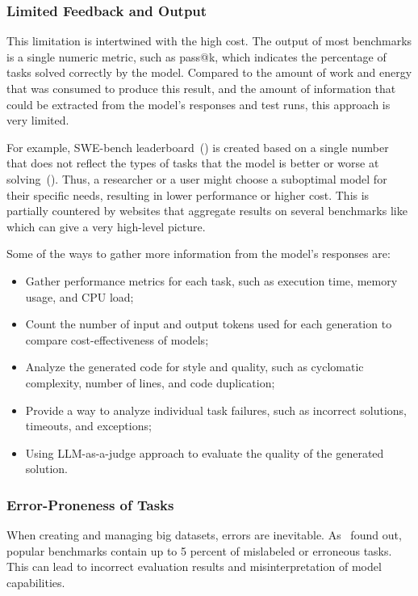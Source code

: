 \subsubsection{Limited Feedback and Output}

This limitation is intertwined with the high cost.
The output of most benchmarks is a single numeric metric, such as pass@k, which indicates the percentage of tasks solved correctly by the model.
Compared to the amount of work and energy that was consumed to produce this result, and the amount of information that could be extracted from the model's responses and test runs, this approach is very limited.

For example, SWE-bench leaderboard~(\cite{swebenchSWEbenchLeaderboards}) is created based on a single number that does not reflect the types of tasks that the model is better or worse at solving~(\cite{miah2024usercentricevaluationcode}).
Thus, a researcher or a user might choose a suboptimal model for their specific needs, resulting in lower performance or higher cost.
This is partially countered by websites that aggregate results on several benchmarks like~\cite{vellumLeaderboard2025} which can give a very high-level picture.

Some of the ways to gather more information from the model's responses are:
\begin{itemize}
    \item Gather performance metrics for each task, such as execution time, memory usage, and CPU load;
    \item Count the number of input and output tokens used for each generation to compare cost-effectiveness of models;
    \item Analyze the generated code for style and quality, such as cyclomatic complexity, number of lines, and code duplication;
    \item Provide a way to analyze individual task failures, such as incorrect solutions, timeouts, and exceptions;
    \item Using LLM-as-a-judge approach to evaluate the quality of the generated solution.
\end{itemize}

\subsubsection{Error-Proneness of Tasks}

When creating and managing big datasets, errors are inevitable.
As~\cite{vendrow2025largelanguagemodelbenchmarks} found out, popular benchmarks contain up to 5 percent of mislabeled or erroneous tasks.
This can lead to incorrect evaluation results and misinterpretation of model capabilities.

